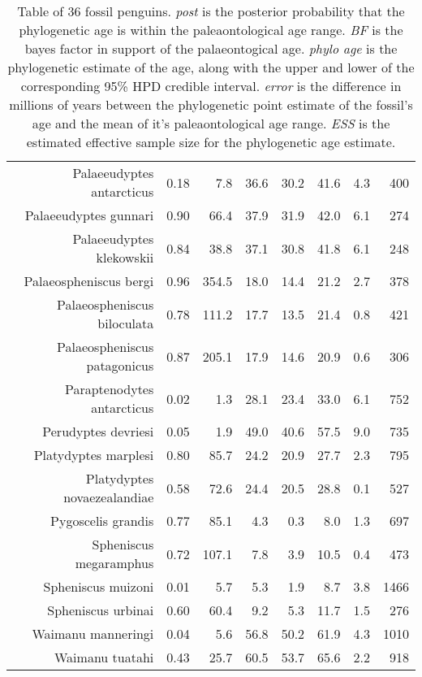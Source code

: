 \begin{table}[ht]
\begin{tabular}{rrrrrrrr}
  Palaeeudyptes antarcticus & 0.18 & 7.8 & 36.6 & 30.2 & 41.6 & 4.3 & 400 \\ 
  Palaeeudyptes gunnari & 0.90 & 66.4 & 37.9 & 31.9 & 42.0 & 6.1 & 274 \\ 
  Palaeeudyptes klekowskii & 0.84 & 38.8 & 37.1 & 30.8 & 41.8 & 6.1 & 248 \\ 
  Palaeospheniscus bergi & 0.96 & 354.5 & 18.0 & 14.4 & 21.2 & 2.7 & 378 \\ 
  Palaeospheniscus biloculata & 0.78 & 111.2 & 17.7 & 13.5 & 21.4 & 0.8 & 421 \\ 
  Palaeospheniscus patagonicus & 0.87 & 205.1 & 17.9 & 14.6 & 20.9 & 0.6 & 306 \\ 
  Paraptenodytes antarcticus & 0.02 & 1.3 & 28.1 & 23.4 & 33.0 & 6.1 & 752 \\ 
  Perudyptes devriesi & 0.05 & 1.9 & 49.0 & 40.6 & 57.5 & 9.0 & 735 \\ 
  Platydyptes marplesi & 0.80 & 85.7 & 24.2 & 20.9 & 27.7 & 2.3 & 795 \\ 
  Platydyptes novaezealandiae & 0.58 & 72.6 & 24.4 & 20.5 & 28.8 & 0.1 & 527 \\ 
  Pygoscelis grandis & 0.77 & 85.1 & 4.3 & 0.3 & 8.0 & 1.3 & 697 \\ 
  Spheniscus megaramphus & 0.72 & 107.1 & 7.8 & 3.9 & 10.5 & 0.4 & 473 \\ 
  Spheniscus muizoni & 0.01 & 5.7 & 5.3 & 1.9 & 8.7 & 3.8 & 1466 \\ 
  Spheniscus urbinai & 0.60 & 60.4 & 9.2 & 5.3 & 11.7 & 1.5 & 276 \\ 
  Waimanu manneringi & 0.04 & 5.6 & 56.8 & 50.2 & 61.9 & 4.3 & 1010 \\ 
  Waimanu tuatahi & 0.43 & 25.7 & 60.5 & 53.7 & 65.6 & 2.2 & 918 \\ 
   \hline
\end{tabular}
\caption{Table of 36 fossil penguins. {\em post} is the posterior probability that the phylogenetic age is within the paleaontological age range. {\em BF} is the bayes factor in support of the palaeontogical age. {\em phylo age} is the phylogenetic estimate of the age, along with the upper and lower of the corresponding 95\% HPD credible interval. {\em error} is the difference in millions of years between the phylogenetic point estimate of the fossil's age and the mean of it's paleaontological age range. {\em ESS} is the estimated effective sample size for the phylogenetic age estimate.} 
\label{fossilTable}
\end{table}
